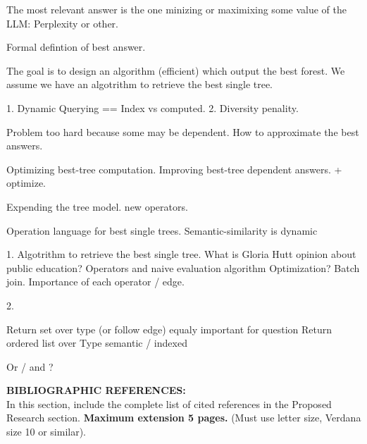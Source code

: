 \documentclass[10pt]{article}
\theoremstyle{definition}
\begin{document}
The most relevant answer is the one minizing or maximixing some value of the LLM: Perplexity or other. 

Formal defintion of best answer.

The goal is to design an algorithm (efficient) which output the best forest. 
We assume we have an algotrithm to retrieve the best single tree. 

1. Dynamic Querying == Index  vs computed. 
2. Diversity penality.

Problem too hard because some may be dependent. 
How to approximate the best answers. 

Optimizing best-tree computation.
Improving best-tree dependent answers. + optimize.




Expending the tree model. new operators. 


Operation language for best single trees. 
Semantic-similarity is dynamic 



1. Algotrithm to retrieve the best single tree. 
What is Gloria Hutt opinion about public education?
Operators and naive evaluation algorithm 
Optimization? Batch join. 
Importance of each operator / edge. 


2. 


Return set over type (or follow edge) equaly important for question
Return ordered list over Type semantic / indexed


Or / and ? 





\newpage

\noindent
\textbf{BIBLIOGRAPHIC REFERENCES:} \\
In this section, include the
complete list of cited references in the Proposed Research
section. {\bf Maximum extension 5 pages.} (Must use letter size, Verdana
size 10 or similar).
\\
\\
\end{document}
